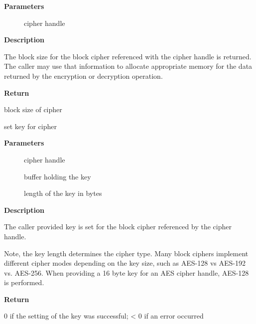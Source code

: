 \documentclass[a4paper,8pt,english]{sphinxmanual}
\begin{document}
\textbf{Parameters}
\begin{description}
\item[{}] \leavevmode
cipher handle

\end{description}

\textbf{Description}

The block size for the block cipher referenced with the cipher handle is
returned. The caller may use that information to allocate appropriate
memory for the data returned by the encryption or decryption operation.

\textbf{Return}

block size of cipher

\begin{fulllineitems}
\label{crypto/api-skcipher:c.crypto_blkcipher_setkey}
set key for cipher

\end{fulllineitems}


\textbf{Parameters}
\begin{description}
\item[{}] \leavevmode
cipher handle

\item[{}] \leavevmode
buffer holding the key

\item[{}] \leavevmode
length of the key in bytes

\end{description}

\textbf{Description}

The caller provided key is set for the block cipher referenced by the cipher
handle.

Note, the key length determines the cipher type. Many block ciphers implement
different cipher modes depending on the key size, such as AES-128 vs AES-192
vs. AES-256. When providing a 16 byte key for an AES cipher handle, AES-128
is performed.

\textbf{Return}

0 if the setting of the key was successful; \textless{} 0 if an error occurred
\end{document}
